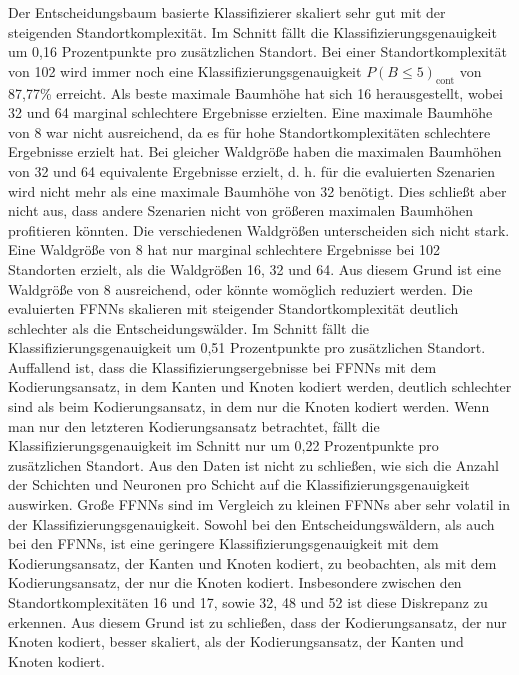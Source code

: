 \newline
\newline
Der Entscheidungsbaum basierte Klassifizierer skaliert sehr gut mit der steigenden Standortkomplexität.
Im Schnitt fällt die Klassifizierungsgenauigkeit um 0,16 Prozentpunkte pro zusätzlichen Standort.
Bei einer Standortkomplexität von 102 wird immer noch eine Klassifizierungsgenauigkeit $P(B\leq5)_{\text{cont}}$ von 87,77\% erreicht.
Als beste maximale Baumhöhe hat sich 16 herausgestellt, wobei 32 und 64 marginal schlechtere Ergebnisse erzielten.
Eine maximale Baumhöhe von 8 war nicht ausreichend, da es für hohe Standortkomplexitäten schlechtere Ergebnisse erzielt hat.
Bei gleicher Waldgröße haben die maximalen Baumhöhen von 32 und 64 equivalente Ergebnisse erzielt,
d. h. für die evaluierten Szenarien wird nicht mehr als eine maximale Baumhöhe von 32 benötigt.
\newpage
Dies schließt aber nicht aus, dass andere Szenarien nicht von größeren maximalen Baumhöhen profitieren könnten.
Die verschiedenen Waldgrößen unterscheiden sich nicht stark.
Eine Waldgröße von 8 hat nur marginal schlechtere Ergebnisse bei 102 Standorten erzielt, als die Waldgrößen 16, 32 und 64.
Aus diesem Grund ist eine Waldgröße von 8 ausreichend, oder könnte womöglich reduziert werden.
\newpage
Die evaluierten FFNNs skalieren mit steigender Standortkomplexität deutlich schlechter als die Entscheidungswälder.
Im Schnitt fällt die Klassifizierungsgenauigkeit um 0,51 Prozentpunkte pro zusätzlichen Standort.
Auffallend ist, dass die Klassifizierungsergebnisse bei FFNNs mit dem Kodierungsansatz, in dem Kanten und Knoten kodiert werden,
deutlich schlechter sind als beim Kodierungsansatz, in dem nur die Knoten kodiert werden.
Wenn man nur den letzteren Kodierungsansatz betrachtet, fällt die Klassifizierungsgenauigkeit im Schnitt nur um 0,22 Prozentpunkte pro zusätzlichen Standort.
Aus den Daten ist nicht zu schließen, wie sich die Anzahl der Schichten und Neuronen pro Schicht auf die Klassifizierungsgenauigkeit auswirken.
Große FFNNs sind im Vergleich zu kleinen FFNNs aber sehr volatil in der Klassifizierungsgenauigkeit.
\newline
\newline
Sowohl bei den Entscheidungswäldern, als auch bei den FFNNs, ist eine geringere Klassifizierungsgenauigkeit mit dem Kodierungsansatz, der Kanten und Knoten kodiert,
zu beobachten, als mit dem Kodierungsansatz, der nur die Knoten kodiert.
Insbesondere zwischen den Standortkomplexitäten 16 und 17, sowie 32, 48 und 52 ist diese Diskrepanz zu erkennen.
Aus diesem Grund ist zu schließen, dass der Kodierungsansatz, der nur Knoten kodiert, besser skaliert, als der Kodierungsansatz, der Kanten und Knoten kodiert.